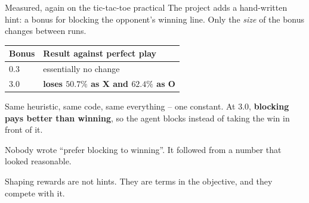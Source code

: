 \documentclass[aspectratio=169]{beamer}
\begin{document}
\begin{frame}{Measured, again on the tic-tac-toe practical}
  \small
  The project adds a hand-written hint: a bonus for blocking the opponent's winning line. Only
  the \emph{size} of the bonus changes between runs.

  \vskip 8pt
  \begin{center}
  \footnotesize
  \begin{tabular}{l l}
    \toprule
    \textbf{Bonus} & \textbf{Result against perfect play} \\
    \midrule
    $0.3$ & essentially no change \\
    $3.0$ & \textbf{loses $50.7\%$ as X and $62.4\%$ as O} \\
    \bottomrule
  \end{tabular}
  \end{center}

  \vskip 8pt
  \begin{tcolorbox}[colback=armred!8, colframe=armred, boxrule=0.7pt, arc=2pt]
    \small
    Same heuristic, same code, same everything -- one constant. At $3.0$, \textbf{blocking pays
    better than winning}, so the agent blocks instead of taking the win in front of it.

    \vskip 4pt
    Nobody wrote ``prefer blocking to winning''. It followed from a number that looked
    reasonable.
  \end{tcolorbox}

  \vskip 6pt
  \begin{center}
    \small
    Shaping rewards are not hints. They are terms in the objective, and they compete with it.
  \end{center}
\end{frame}
\end{document}
